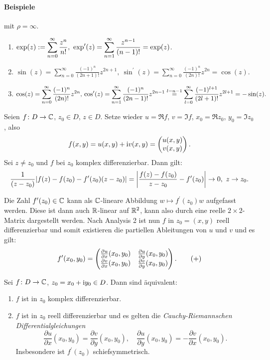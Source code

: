 \documentclass[a4paper,twoside,DIV15,BCOR12mm]{scrbook}
\begin{document}
\paragraph{Beispiele} mit $\rho = \infty$.\begin{enumerate}
\item $\displaystyle \exp(z) := \sum_{n=0}^\infty \frac{z^n}{n!},\ \exp^\prime(z) = \sum_{n=1}^\infty \frac{z^{n-1}}{(n-1)!} = \exp(z)$.
\item $\displaystyle \sin(z) = \sum_{n=0}^\infty \frac{(-1)^n}{(2n+1)!}z^{2n+1},\ \sin^\prime(z) = \sum_{n=0}^\infty \frac{(-1)^n}{(2n)!}z^{2n} = \cos(z).$
\item $\displaystyle \cos(z) = \sum_{n=0}^\infty \frac{(-1)^n}{(2n)!}z^{2n},\newline \cos^\prime(z) = \sum_{n=1}^\infty \frac{(-1)^n}{(2n-1)!}z^{2n-1} \stackrel{l=n-1}{=} \sum_{l=0}^\infty \frac{(-1)^{l+1}}{(2l+1)!}z^{2l+1} = -\sin(z).$
\end{enumerate}


\noindent Seien $f\colon D\rightarrow\mathbb{C}$, $z_0\in D$, $z\in D$. Setze wieder $u = \Re f$, $v = \Im f$, $x_0 = \Re z_0$, $y_0 = \Im z_0$, also
\[f(x,y) = u(x,y) + \mathrm{i} v(x,y) = \left(\!\!\!\begin{array}{c}u(x,y)\\v(x,y)\end{array}\!\!\!\right).\]
Sei $z\neq z_0$ und $f$ bei $z_0$ komplex differenzierbar. Dann gilt:
\[\frac{1}{(z-z_0)}|f(z)-f(z_0)-f^\prime(z_0)(z-z_0)| = \left|\frac{f(z)-f(z_0)}{z-z_0} - f^\prime(z_0)\right| \rightarrow 0,\ z\rightarrow z_0.\]

Die Zahl $f^\prime(z_0)\in\mathbb{C}$ kann als $\mathbb{C}$-lineare Abbildung $w\mapsto f^\prime(z_0)w$ aufgefasst werden. Diese ist dann auch $\mathbb{R}$-linear auf $\mathbb{R}^2$, kann also durch eine reelle $2\times 2$-Matrix dargestellt werden. Nach Analysis 2 ist nun $f$ in $z_0 = (x,y)$ reell differenzierbar und somit existieren die partiellen Ableitungen von $u$ und $v$ und es gilt:
\[\label{1.3+}f^\prime(x_0,y_0) = \left(\!\!\!\begin{array}{c c}\frac{\partial u}{\partial x} (x_0,y_0) & \frac{\partial u}{\partial y} (x_0,y_0)\\
\frac{\partial v}{\partial x} (x_0,y_0) & \frac{\partial v}{\partial y} (x_0,y_0)\end{array}\!\!\!\right).\tag{+}\]

\begin{satz} \label{satz1.4}
  Sei $f\colon D\rightarrow\mathbb{C}$, $z_0 = x_0 + \mathrm{i} y_0\in D$. Dann sind äquivalent:
\begin{enumerate}
\item $f$ ist in $z_0$ komplex differenzierbar.
\item $f$ ist in $z_0$ reell differenzierbar und es gelten die \emph{Cauchy-Riemannschen Differentialgleichungen}
\begin{equation} \label{CR}
\frac{\partial u}{\partial x} (x_0,y_0) = \frac{\partial v}{\partial y} (x_0,y_0),\quad \frac{\partial u}{\partial y} (x_0,y_0) =
-\frac{\partial v}{\partial x} (x_0,y_0). \tag{CR}
\end{equation}
Insbesondere ist $f^\prime(z_0)$ schiefsymmetrisch.
\end{enumerate}
\end{satz}
\end{document}
